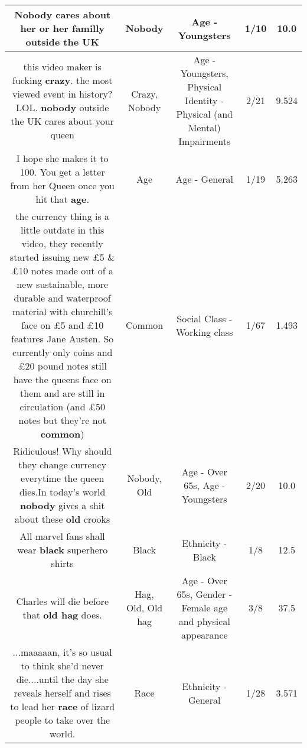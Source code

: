 \documentclass[11pt]{article}
\newlength\mylength
\begin{document}
\begin{center}
\begin{longtable}{|C{.65\mylength}|C{.30\mylength}|C{.12\mylength}|C{.12\mylength}|C{.12\mylength}|}
  \small Nobody cares about her or her familly outside the UK\normalsize   & Nobody & Age - Youngsters & 1/10 & 10.0 \\  \hline
  \small this video maker is fucking \textbf{crazy}. the most viewed event in history? LOL. \textbf{nobody} outside the UK cares about your queen\normalsize   & Crazy, Nobody & Age - Youngsters, Physical Identity - Physical (and Mental) Impairments & 2/21 & 9.524 \\  \hline
  \small I hope she makes it to 100. You get a letter from her Queen once you hit that \textbf{age}.\normalsize   & Age & Age - General & 1/19 & 5.263 \\  \hline
  \small the currency thing is a little outdate in this video, they recently started issuing new £5 \& £10 notes made out of a new sustainable, more durable and waterproof material with churchill's face on £5 and £10 features Jane Austen. So currently only coins and £20 pound notes still have the queens face on them and are still in circulation (and £50 notes but they're not \textbf{common})\normalsize   & Common & Social Class - Working class & 1/67 & 1.493 \\  \hline
  \small Ridiculous! Why should they change currency everytime the queen dies.In today's world \textbf{nobody} gives a shit about these \textbf{old} crooks\normalsize   & Nobody, Old & Age - Over 65s, Age - Youngsters & 2/20 & 10.0 \\  \hline
  \small All marvel fans shall wear \textbf{black} superhero shirts\normalsize   & Black & Ethnicity - Black & 1/8 & 12.5 \\  \hline
  \small Charles will die before that \textbf{o\textbf{ld} h\textbf{ag}} does.\normalsize   & Hag, Old, Old hag & Age - Over 65s, Gender - Female age and physical appearance & 3/8 & 37.5 \\  \hline
  \small ...maaaaan, it's so usual to think she'd never die....until the day she reveals herself and rises to lead her \textbf{race} of lizard people to take over the world.\normalsize   & Race & Ethnicity - General & 1/28 & 3.571 \\  \hline

\end{longtable}
\end{center}
\end{document}
